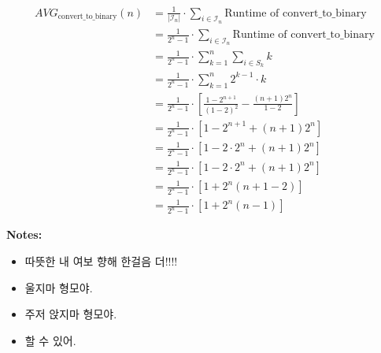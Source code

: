 \documentclass[12pt]{article}
\begin{document}
\begin{enumerate}[a.]
\begin{mdframed}
\begin{enumerate}[1.]
        \begin{mdframed}
            \begin{align}
                AVG_{\text{convert\_to\_binary}}(n) &= \frac{1}{\lvert \mathcal{I}_n \rvert} \cdot \sum\limits_{i \in \mathcal{I}_n} \text{Runtime of convert\_to\_binary}\\
                &= \frac{1}{2^n - 1} \cdot \sum\limits_{i \in \mathcal{I}_n} \text{Runtime of convert\_to\_binary}\\
                &= \frac{1}{2^n - 1} \cdot \sum\limits_{k = 1}^n \sum\limits_{i \in S_k} k\\
                &= \frac{1}{2^n - 1} \cdot \sum\limits_{k = 1}^n 2^{k-1} \cdot k\\
                &= \frac{1}{2^n - 1} \cdot \left[ \frac{1 - 2^{n+1}}{(1-2)^2} - \frac{(n+1)2^n}{1-2} \right]\\
                &= \frac{1}{2^n - 1} \cdot \left[ 1 - 2^{n+1} + (n+1)2^n \right]\\
                &= \frac{1}{2^n - 1} \cdot \left[ 1 - 2 \cdot 2^n + (n+1)2^n \right]\\
                &= \frac{1}{2^n - 1} \cdot \left[ 1 - 2 \cdot 2^n + (n+1)2^n \right]\\
                &= \frac{1}{2^n - 1} \cdot \left[ 1 + 2^n(n+1 - 2) \right]\\
                &= \frac{1}{2^n - 1} \cdot \left[ 1 + 2^n(n-1) \right]
            \end{align}
        \end{mdframed}
    \end{enumerate}

    \end{mdframed}

    \bigskip

    \textbf{Notes:}

    \begin{itemize}
        \item 따뜻한 내 여보 향해 한걸음 더!!!!
        \item 울지마 형모야.
        \item 주저 앉지마 형모야.
        \item 할 수 있어.
    \end{itemize}

\end{enumerate}
\end{document}
